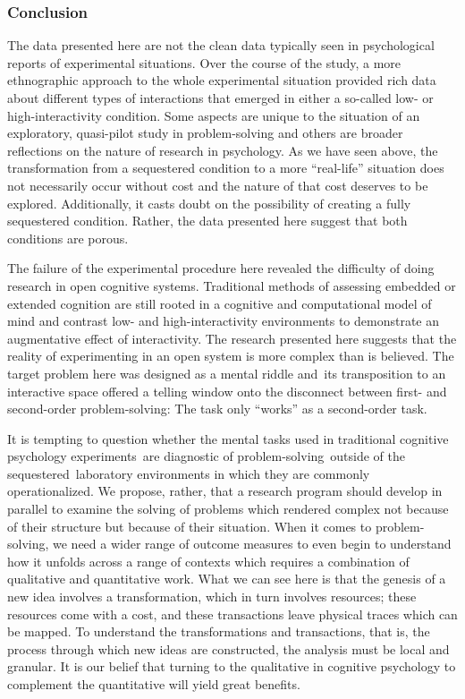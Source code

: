 \documentclass{article}
\begin{document}
\subsubsection{Conclusion}

The data presented here are not the clean data typically seen in psychological reports of experimental situations. Over the course of the study, a more ethnographic approach to the whole experimental situation provided rich data about different types of interactions that emerged in either a so-called low- or high-interactivity condition. Some aspects are unique to the situation of an exploratory, quasi-pilot study in problem-solving and others are broader reflections on the nature of research in psychology. As we have seen above, the transformation from a sequestered condition to a more “real-life” situation does not necessarily occur without cost and the nature of that cost deserves to be explored. Additionally, it casts doubt on the possibility of creating a fully sequestered condition. Rather, the data presented here suggest that both conditions are porous. 

The failure of the experimental procedure here revealed the difficulty of doing research in open cognitive systems. Traditional methods of assessing embedded or extended cognition are still rooted in a cognitive and computational model of mind and contrast low- and high-interactivity environments to demonstrate an augmentative effect of interactivity. The research presented here suggests that the reality of experimenting in an open system is more complex than is believed. The target problem here was designed as a mental riddle and its transposition to an interactive space offered a telling window onto the disconnect between first- and second-order problem-solving: The task only “works” as a second-order task.

It is tempting to question whether the mental tasks used in traditional cognitive psychology experiments are diagnostic of problem-solving outside of the sequestered laboratory environments in which they are commonly operationalized. We propose, rather, that a research program should develop in parallel to examine the solving of problems which rendered complex not because of their structure but because of their situation. When it comes to problem-solving, we need a wider range of outcome measures to even begin to understand how it unfolds across a range of contexts which requires a combination of qualitative and quantitative work. What we can see here is that the genesis of a new idea involves a transformation, which in turn involves resources; these resources come with a cost, and these transactions leave physical traces which can be mapped. To understand the transformations and transactions, that is, the process through which new ideas are constructed, the analysis must be local and granular. It is our belief that turning to the qualitative in cognitive psychology to complement the quantitative will yield great benefits.
\end{document}
